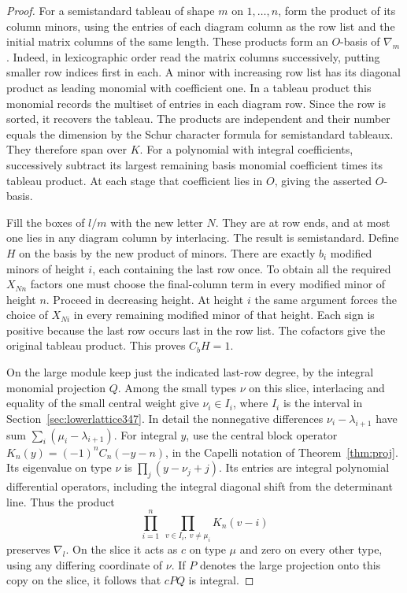 \documentclass[a4paper,11pt]{article}
\theoremstyle{definition}
\theoremstyle{remark}
\numberwithin{equation}{section}
\begin{document}
\begin{proof}
For a semistandard tableau of shape \(m\) on \(1,\ldots,n\),
form the product of its column minors, using the entries of
each diagram column as the row list and the initial matrix
columns of the same length. These products form an \(O\)-basis
of \(\nabla_m\). Indeed, in lexicographic order read the
matrix columns successively, putting smaller row indices first
in each. A minor with increasing row list has its diagonal
product as leading monomial with coefficient one. In a tableau
product this monomial records the multiset of entries in each
diagram row. Since the row is sorted, it recovers the tableau.
The products are independent and their number equals the
dimension by the Schur character formula for semistandard
tableaux.~\cite[Chapters 1 and 8]{XXIII-XVIII-fulton351}
They therefore span over \(K\). For a polynomial with integral
coefficients, successively subtract its largest remaining basis
monomial coefficient times its tableau product. At each stage
that coefficient lies in \(O\), giving the asserted \(O\)-basis.

Fill the boxes of \(l/m\) with the new letter \(N\). They are
at row ends, and at most one lies in any diagram column by
interlacing. The result is semistandard. Define \(H\) on the
basis by the new product of minors. There are exactly \(b_i\)
modified minors of height \(i\), each containing the last row
once. To obtain all the required \(X_{Nn}\) factors one must
choose the final-column term in every modified minor of height
\(n\). Proceed in decreasing height. At height \(i\) the
same argument forces the choice of \(X_{Ni}\) in every remaining
modified minor of that height. Each sign is positive because
the last row occurs last in the row list. The cofactors give
the original tableau product. This proves \(C_bH=1\).

On the large module keep just the indicated last-row degree,
by the integral monomial projection \(Q\). Among the small
types \(\nu\) on this slice, interlacing and equality of the
small central weight give
\(\nu_i\in I_i\), where \(I_i\) is the interval in
Section~\ref{sec:lowerlattice347}. In detail the nonnegative
differences \(\nu_i-\lambda_{i+1}\) have sum
\(\sum_i(\mu_i-\lambda_{i+1})\). For integral \(y\), use the
central block operator \(K_n(y)=(-1)^n C_n(-y-n)\), in the
Capelli notation of Theorem~\ref{thm:proj}. Its eigenvalue on
type \(\nu\) is \(\prod_j(y-\nu_j+j)\). Its entries are integral
polynomial differential operators, including the integral
diagonal shift from the determinant line. Thus the product
\[
            \prod_{i=1}^n\ \prod_{v\in I_i,\ v\ne\mu_i} K_n(v-i)
\]
preserves \(\nabla_l\). On the slice it acts as \(c\) on type
\(\mu\) and zero on every other type, using any differing
coordinate of \(\nu\). If \(P\) denotes the large projection
onto this copy on the slice, it follows that \(cPQ\) is integral.


\end{proof}
\end{document}
